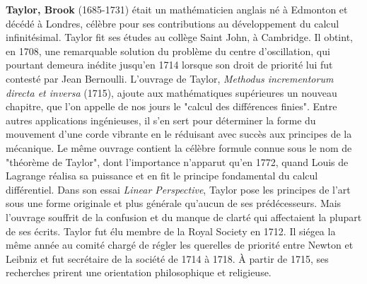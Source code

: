 {}
\label{sec:T}

\textbf{Taylor, Brook} (1685-1731) était un mathématicien anglais né à Edmonton et décédé à Londres, célèbre pour ses contributions au développement du calcul infinitésimal. Taylor fit ses études au collège Saint John, à Cambridge. Il obtint, en 1708, une remarquable solution du problème du centre d'oscillation, qui pourtant demeura inédite jusqu'en 1714 lorsque son droit de priorité lui fut contesté par Jean Bernoulli. L'ouvrage de Taylor, \textit{Methodus incrementorum directa et inversa} (1715), ajoute aux mathématiques supérieures un nouveau chapitre, que l'on appelle de nos jours le "calcul des différences finies". Entre autres applications ingénieuses, il s'en sert pour déterminer la forme du mouvement d'une corde vibrante en le réduisant avec succès aux principes de la mécanique. Le même ouvrage contient la célèbre formule connue sous le nom de "théorème de Taylor", dont l'importance n'apparut qu'en 1772, quand Louis de Lagrange réalisa sa puissance et en fit le principe fondamental du calcul différentiel. Dans son essai \textit{Linear Perspective}, Taylor pose les principes de l'art sous une forme originale et plus générale qu'aucun de ses prédécesseurs. Mais l'ouvrage souffrit de la confusion et du manque de clarté qui affectaient la plupart de ses écrits. Taylor fut élu membre de la Royal Society en 1712. Il siégea la même année au comité chargé de régler les querelles de priorité entre Newton et Leibniz et fut secrétaire de la société de 1714 à 1718. À partir de 1715, ses recherches prirent une orientation philosophique et religieuse.

